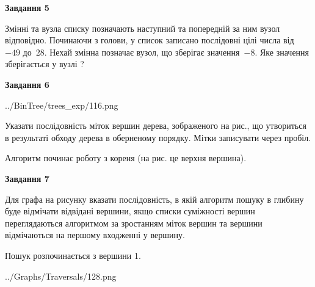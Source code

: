 \documentclass[12pt, ukrainian]{article}
\begin{document}
{\begin {large}
{\begin {center}\textbf{Завдання 5}\end {center}}\par
Змінні  та  вузла списку позначають наступний та попередній за ним вузол відповідно. Починаючи з голови, у список записано послідовні цілі числа від~$-49$ до~$28$. Нехай змінна  позначає вузол, що зберігає значення~$-8$.
Яке значення зберігається у вузлі  ?\par
\newpage

{\begin {center}\textbf{Завдання 6}\end {center}}\par

\begin{center}
	{../BinTree/trees_exp/116.png}
\end{center}
Указати послідовність міток вершин дерева, зображеного на рис., що утвориться в результаті обходу дерева в оберненому порядку. Мітки записувати через пробіл.\par Алгоритм починає роботу з кореня (на рис. це верхня вершина).\par
\newpage

{\begin {center}\textbf{Завдання 7}\end {center}}\par
Для графа на рисунку вказати послідовність, в якій алгоритм пошуку в глибину буде відмічати відвідані вершини, якщо списки суміжності вершин переглядаються алгоритмом за зростанням міток вершин та вершини відмічаються на першому вход\-женні у вершину.\par
Пошук розпочинається з вершини 1.\par

\begin{center}
	{../Graphs/Traversals/128.png}
\end{center}\par
\newpage


\end{large}}
\end{document}
